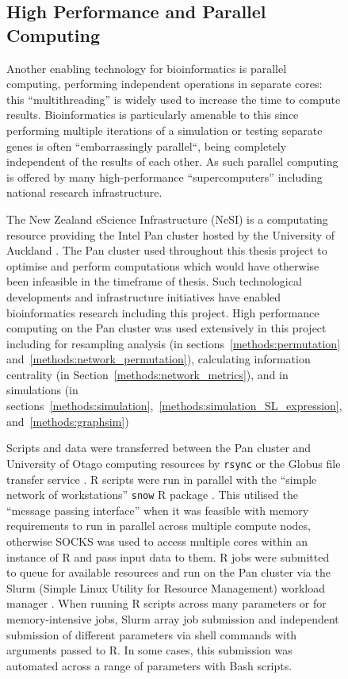\begin{figure}[!htp]
\FloatBarrier

\subsection{High Performance and Parallel Computing} \label{methods:HPC}
Another enabling technology for bioinformatics is parallel computing, performing independent operations in separate cores: this ``multithreading'' is widely used to increase the time to compute results. Bioinformatics is particularly amenable to this since performing multiple iterations of a simulation or testing separate genes is often ``embarrassingly parallel``, being completely independent of the results of each other. As such parallel computing is offered by many high-performance ``supercomputers'' including national research infrastructure.

The New Zealand eScience Infrastructure (NeSI) is a computating resource providing the Intel Pan cluster hosted by the University of Auckland \citep{NeSI}. The Pan cluster used throughout this thesis project to optimise and perform computations which would have otherwise been infeasible in the timeframe of thesis. Such technological developments and infrastructure initiatives have enabled bioinformatics research including this project.  High performance computing on the Pan cluster was used extensively in this project including for resampling analysis (in sections~\ref{methods:permutation} and~\ref{methods:network_permutation}), calculating information centrality (in Section~\ref{methods:network_metrics}), and in simulations (in sections~\ref{methods:simulation},~\ref{methods:simulation_SL_expression}, and~\ref{methods:graphsim})

Scripts and data were transferred between the Pan cluster and University of Otago computing resources by \texttt{rsync} or the Globus file transfer service \citep{Globus}. R scripts \citep{R_core} were run in parallel with the ``simple network of workstations'' \texttt{snow} R package \citet{snow}. This utilised the ``message passing interface'' \citep{Rmpi} when it was feasible with memory requirements to run in parallel across multiple compute nodes, otherwise SOCKS was used to access multiple cores within an instance of R and pass input data to them. R jobs were submitted to queue for available resources and run on the Pan cluster via the Slurm (Simple Linux Utility for Resource Management) workload manager \citep{slurm}. When running R scripts across many parameters or for memory-intensive jobs, Slurm array job submission and independent submission of different parameters via shell commands with arguments passed to R. In some cases, this submission was automated across a range of parameters with Bash scripts.


\end{figure}
